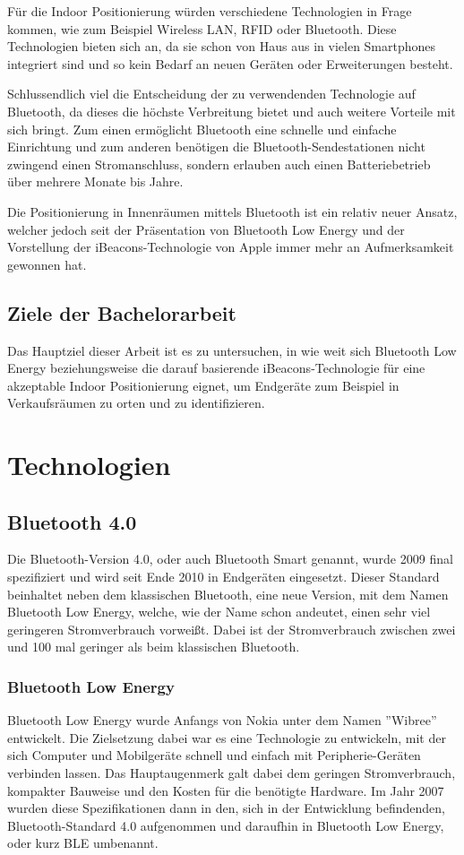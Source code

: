 \documentclass[liststotoc,a4paper, 12pt]{scrartcl}
\begin{document}
Für die Indoor Positionierung würden verschiedene Technologien in Frage kommen, wie zum Beispiel Wireless LAN, RFID oder Bluetooth.
Diese Technologien bieten sich an, da sie schon von Haus aus in vielen Smartphones integriert sind und so kein Bedarf an neuen Geräten oder Erweiterungen besteht.



Schlussendlich viel die Entscheidung der zu verwendenden Technologie auf Bluetooth, da dieses die höchste Verbreitung bietet und auch weitere Vorteile mit sich bringt. Zum einen ermöglicht Bluetooth eine schnelle und einfache Einrichtung und zum anderen benötigen die Bluetooth-Sendestationen nicht zwingend einen Stromanschluss, sondern erlauben auch einen Batteriebetrieb über mehrere Monate bis Jahre.

Die Positionierung in Innenräumen mittels Bluetooth ist ein relativ neuer Ansatz, welcher jedoch seit der Präsentation von Bluetooth Low Energy und der Vorstellung der iBeacons-Technologie von Apple immer mehr an Aufmerksamkeit gewonnen hat. 



\subsection{Ziele der Bachelorarbeit}
Das Hauptziel dieser Arbeit ist es zu untersuchen, in wie weit sich Bluetooth Low Energy beziehungsweise die darauf basierende iBeacons-Technologie für eine akzeptable Indoor Positionierung eignet, um Endgeräte zum Beispiel in Verkaufsräumen zu orten und zu identifizieren.


\section{Technologien}

\subsection{Bluetooth 4.0}
Die Bluetooth-Version 4.0, oder auch Bluetooth Smart genannt, wurde 2009 final spezifiziert und wird seit Ende 2010 in Endgeräten eingesetzt.
Dieser Standard beinhaltet neben dem klassischen Bluetooth, eine neue Version, mit dem Namen Bluetooth Low Energy, welche, wie der Name schon andeutet, einen sehr viel geringeren Stromverbrauch vorweißt. Dabei ist der Stromverbrauch zwischen zwei und 100 mal geringer als beim klassischen Bluetooth.

\subsubsection{Bluetooth Low Energy}
Bluetooth Low Energy wurde Anfangs von Nokia unter dem Namen ''Wibree'' entwickelt. Die Zielsetzung dabei war es eine Technologie zu entwickeln, mit der sich Computer und Mobilgeräte schnell und einfach mit Peripherie-Geräten verbinden lassen. Das Hauptaugenmerk galt dabei dem geringen Stromverbrauch, kompakter Bauweise und den Kosten für die benötigte Hardware.
Im Jahr 2007 wurden diese Spezifikationen dann in den, sich in der Entwicklung befindenden, Bluetooth-Standard 4.0 aufgenommen und daraufhin in Bluetooth Low Energy, oder kurz BLE umbenannt.
\end{document}
